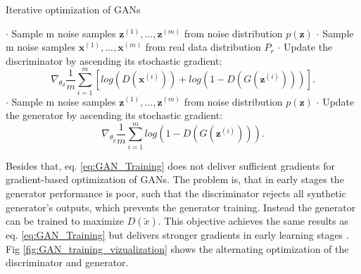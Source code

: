 \begin{algorithm}
\caption{Iterative optimization of GANs}\label{alg:cap}
\begin{algorithmic}
        \State $\cdot$ Sample m noise samples ${\pmb{z}^{(1)}, . . . , \pmb{z}^{(m)}}$ from noise distribution $p(\pmb{z})$
        \State $\cdot$ Sample m noise samples ${\pmb{x}^{(1)}, . . . , \pmb{x}^{(m)}}$ from real data distribution $P_{r}$
        \State $\cdot$ Update the discriminator by ascending its stochastic gradient:
        \begin{equation*}
            \nabla_{\theta_{d}} \frac{1}{m} \sum_{i=1}^{m} [log(D(\pmb{x}^{(i)})) + log(1-D(G(\pmb{z}^{(i)})))].
        \end{equation*}
    \EndWhile
    \State $\cdot$ Sample m noise samples ${\pmb{z}^{(1)}, . . . , \pmb{z}^{(m)}}$ from noise distribution $p(\pmb{z})$
    \State $\cdot$ Update the generator by ascending its stochastic gradient:
    \begin{equation*}
        \nabla_{\theta_{g}} \frac{1}{m} \sum_{i=1}^{m} log(1-D(G(\pmb{z}^{(i)}))).
    \end{equation*}
\EndWhile
\label{alg.GAN_optimization}
\end{algorithmic}
\end{algorithm}

Besides that, eq. \ref{eq:GAN_Training} does not deliver sufficient gradients for gradient-based optimization of GANs. The problem is, that in early stages the generator performance is poor, such that the discriminator rejects all synthetic generator's outputs, which prevents the generator training. Instead the generator can be trained to maximize $D(\tilde{x})$. This objective achieves the same results as eq. \ref{eq:GAN_Training} but delivers stronger gradients in early learning stages \cite{Goodfellow2014}. Fig \ref{fig:GAN_training_vizualization} shows the alternating optimization of the discriminator and generator. 

